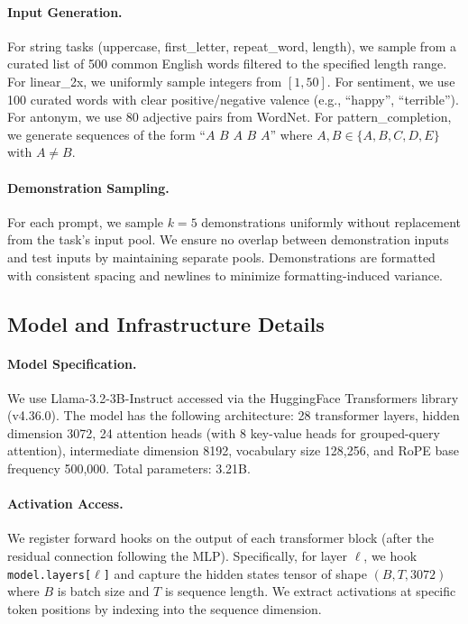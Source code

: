 \documentclass{article}
\begin{document}
\paragraph{Input Generation.} For string tasks (uppercase, first\_letter, repeat\_word, length), we sample from a curated list of 500 common English words filtered to the specified length range. For linear\_2x, we uniformly sample integers from $[1, 50]$. For sentiment, we use 100 curated words with clear positive/negative valence (e.g., ``happy'', ``terrible''). For antonym, we use 80 adjective pairs from WordNet. For pattern\_completion, we generate sequences of the form ``$A$ $B$ $A$ $B$ $A$'' where $A, B \in \{A, B, C, D, E\}$ with $A \neq B$.

\paragraph{Demonstration Sampling.} For each prompt, we sample $k=5$ demonstrations uniformly without replacement from the task's input pool. We ensure no overlap between demonstration inputs and test inputs by maintaining separate pools. Demonstrations are formatted with consistent spacing and newlines to minimize formatting-induced variance.

\subsection{Model and Infrastructure Details}

\paragraph{Model Specification.} We use Llama-3.2-3B-Instruct accessed via the HuggingFace Transformers library (v4.36.0). The model has the following architecture: 28 transformer layers, hidden dimension 3072, 24 attention heads (with 8 key-value heads for grouped-query attention), intermediate dimension 8192, vocabulary size 128,256, and RoPE base frequency 500,000. Total parameters: 3.21B.

\paragraph{Activation Access.} We register forward hooks on the output of each transformer block (after the residual connection following the MLP). Specifically, for layer $\ell$, we hook \texttt{model.layers[$\ell$]} and capture the hidden states tensor of shape $(B, T, 3072)$ where $B$ is batch size and $T$ is sequence length. We extract activations at specific token positions by indexing into the sequence dimension.
\end{document}
